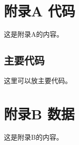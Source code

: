 \documentclass[degree=bachelor]{sduthesis}
\begin{document}
\MakeCover

\tableofcontents

\appendix
\chapter{附录A 代码}
这是附录A的内容。

\section{主要代码}
这里可以放主要代码。



\chapter{附录B 数据}
这是附录B的内容。

\nocite{*}

\end{document}
